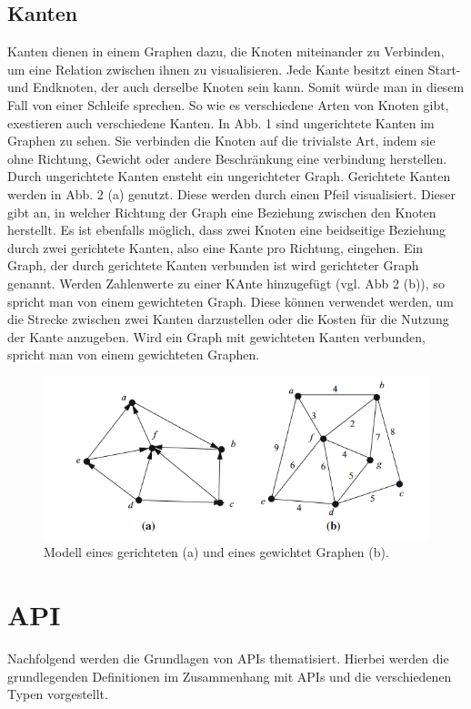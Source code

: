 \subsection{Kanten} %
\label{sec:kanten}
Kanten dienen in einem Graphen dazu, die Knoten miteinander zu Verbinden, um eine Relation zwischen ihnen zu visualisieren. Jede Kante besitzt einen Start- und Endknoten, der auch derselbe Knoten sein kann. Somit würde man in diesem Fall von einer Schleife sprechen. So wie es verschiedene Arten von Knoten gibt, exestieren auch verschiedene Kanten. 
\newline
In Abb. 1 sind ungerichtete Kanten im Graphen zu sehen. Sie verbinden die Knoten auf die trivialste Art, indem sie ohne Richtung, Gewicht oder andere Beschränkung eine verbindung herstellen. Durch ungerichtete Kanten ensteht ein ungerichteter Graph.
Gerichtete Kanten werden in Abb. 2 (a) genutzt. Diese werden durch einen Pfeil visualisiert. Dieser gibt an, in welcher Richtung der Graph eine Beziehung zwischen den Knoten herstellt. Es ist ebenfalls möglich, dass zwei Knoten eine beidseitige Beziehung durch zwei gerichtete Kanten, also eine Kante pro Richtung, eingehen. Ein Graph, der durch gerichtete Kanten verbunden ist wird gerichteter Graph genannt.
Werden Zahlenwerte zu einer KAnte hinzugefügt (vgl. Abb 2 (b)), so spricht man von einem gewichteten Graph. Diese können verwendet werden, um die Strecke zwischen zwei Kanten darzustellen oder die Kosten für die Nutzung der Kante anzugeben. Wird ein Graph mit gewichteten Kanten verbunden, spricht man von einem gewichteten Graphen.
\begin{figure}[H]
	\centering
	\includegraphics[scale=1]{Illustrations/graph_01.png}
	\caption{Modell eines gerichteten (a) und eines gewichtet Graphen (b). \citep{graphTheory}}
\end{figure}



\section{API} %
\label{sec:apigrundlagen}
Nachfolgend werden die Grundlagen von APIs thematisiert. Hierbei werden die grundlegenden Definitionen im Zusammenhang mit APIs und die verschiedenen Typen vorgestellt.

